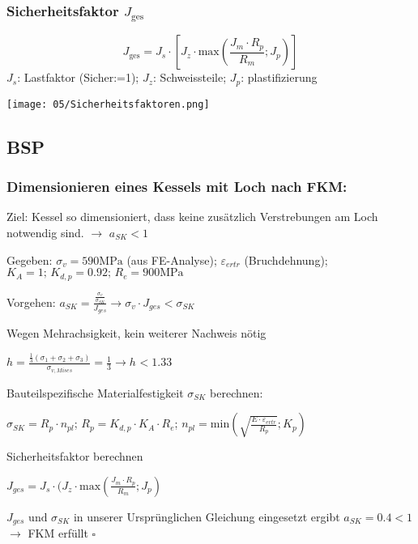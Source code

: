        \subsubsection{Sicherheitsfaktor $J_{\textrm{ges}}$}
        \small\[J_{\textrm{ges}}= J_s \cdot \left[ J_z \cdot \textrm{max}\left(\frac{J_m \cdot R_p}{R_m}; J_p \right) \right] \]\normalsize
        $J_s$: Lastfaktor (Sicher:=1); $J_z$: Schweissteile; $J_p$: plastifizierung
        \begin{center}
            \texttt{[image: 05/Sicherheitsfaktoren.png]}
        \end{center}
    
    \subsection{BSP}
        \subsubsection{Dimensionieren eines Kessels mit Loch nach FKM:}
        Ziel: Kessel so dimensioniert, dass keine zusätzlich Verstrebungen am Loch notwendig sind. $\rightarrow$  $ a_{SK}<1 $
        
        Gegeben: $ \sigma_v = 590 \textrm{MPa} $ (aus FE-Analyse); $ \varepsilon_{ertr} $ (Bruchdehnung); $K_A = 1 \textrm{; } K_{d,p} = 0.92 \textrm{; } R_e = 900 \textrm{MPa} $
        
        Vorgehen:
        $ a_{{SK}} = \frac{\frac{\sigma_v}{\sigma_{{SK}}}}{J_{ges}}  \rightarrow  \sigma_v \cdot J_{ges} < \sigma_{{SK}} $
        
        Wegen Mehrachsigkeit, kein weiterer Nachweis nötig
        
        $ h = \frac{\frac{1}{3}(\sigma_1+\sigma_2+\sigma_3)}{\sigma_{{v,Mises}}}=\frac{1}{3} 
        \rightarrow  h_{} < 1.33_{} $
        
        Bauteilspezifische Materialfestigkeit $ \sigma_{SK} $ berechnen:
        
        $ \sigma_{SK} = R_p \cdot n_{pl} $;
        $ R_p = K_{d,p} \cdot K_A \cdot R_e $; %
        $ n_{pl} = \textrm{min}(\sqrt{\frac{E \cdot \varepsilon_{ertr}}{R_p}}; K_p) $
        
        Sicherheitsfaktor berechnen
        
        $ J_{ges} = J_s \cdot ( J_z \cdot \textrm{max}(\frac{J_m \cdot R_p}{R_m} ; J_p) $
        
        $ {J_{ges}} \textrm{ und } \sigma_{SK}$ in unserer Ursprünglichen Gleichung eingesetzt ergibt ${a_{SK} = 0.4 < 1} $ $\rightarrow$ FKM erfüllt $\square$ 
